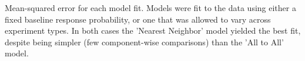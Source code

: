 \label{fig:mses}
Mean-squared error for each model fit. Models were fit to the data using either a fixed baseline response probability, or one that was allowed to vary across experiment types.  In both cases the 'Nearest Neighbor' model yielded the best fit, despite being simpler (few component-wise comparisons) than the 'All to All' model.  